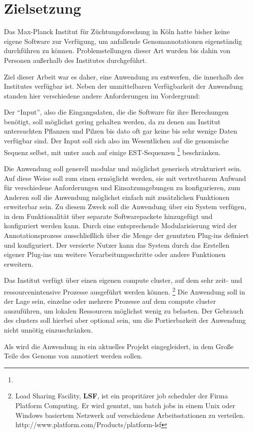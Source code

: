 
\chapter{Zielsetzung}
Das Max-Planck Institut für Züchtungsforschung in Köln hatte bisher keine
eigene Software zur Verfügung, um anfallende Genomannotationen eigenständig
durchführen zu können. Problemstellungen dieser Art wurden bis dahin von
Personen außerhalb des Institutes durchgeführt.

Ziel dieser Arbeit war es daher, eine Anwendung zu entwerfen, die
innerhalb des Institutes verfügbar ist. Neben der unmittelbaren Verfügbarkeit
der Anwendung standen hier verschiedene andere Anforderungen im Vordergrund:

Der \enquote{Input}, also die Eingangsdaten, die die Software für ihre
Berechungen benötigt, soll möglichst gering gehalten werden, da zu denen am
Institut untersuchten Pflanzen und Pilzen bis dato oft gar keine bis sehr wenige
Daten verfügbar sind.
Der Input soll sich also im Wesentlichen auf die genomische Sequenz selbst, mit
unter auch auf einige EST-Sequenzen
\footnote{}
beschränken.

Die Anwendung soll generell modular und möglichst generisch strukturiert sein.
Auf diese Weise soll zum einen ermöglicht werden, sie mit vertretbarem
Aufwand für verschiedene Anforderungen und Einsatzumgebungen zu konfigurieren,
zum Anderen soll die Anwendung möglichst einfach mit zusätzlichen Funktionen
erweiterbar sein.
Zu diesem Zweck soll die Anwendung über ein  System verfügen, in
dem Funktionalität über separate Softwarepackete hinzugefügt und konfiguriert
werden kann.
Durch eine entsprechende  Modularisierung wird der Annotationsprozess
ausschließlich über die Menge der genutzten Plug-ins definiert und
konfiguriert.
Der versierte Nutzer kann das System durch das Erstellen eigener Plug-ins um
weitere Verarbeitungsschritte oder andere Funktionen erweitern.

Das Institut verfügt über einen eigenen compute cluster, auf dem sehr zeit- und
ressourcenintensive Prozesse ausgeführt werden können.
\footnote{Load Sharing Facility, \textbf{LSF}, ist ein propritärer job scheduler
der Firma Platform Computing. Er wird genutzt, um batch jobs in einem Unix oder
Windows basiertem Netzwerk auf verschiedene Arbeitsstationen zu
verteilen. \citep{ault_oracle_2004} {http://www.platform.com/Products/platform-lsf}}
Die Anwendung soll in der Lage sein, einzelne oder mehrere Prozesse auf dem
compute cluster auszuführen, um lokalen Ressourcen möglichst wenig zu
belasten. Der Gebrauch des clusters soll hierbei aber optional sein, um die
Portierbarkeit der Anwendung nicht unnötig einzuschränken. 

Als  wird die Anwendung in ein aktuelles Projekt
eingegleidert, in dem Große Teile des Genoms von  annotiert werden sollen. 

